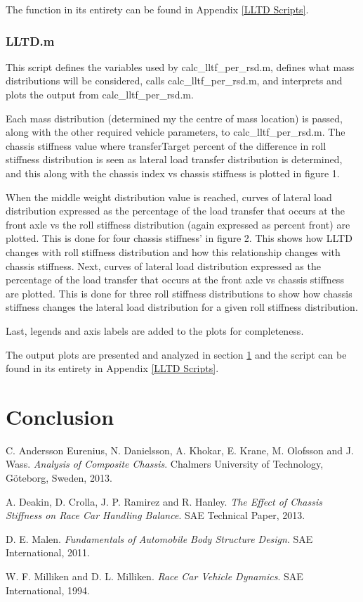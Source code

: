 \documentclass[a4paper]{article}
\numberwithin{equation}{section}
\begin{document}
The function in its entirety can be found in Appendix \ref{LLTD Scripts}.

\subsubsection{LLTD.m} \label{LLTD.m}
This script defines the variables used by calc\_lltf\_per\_rsd.m, defines what mass distributions will be considered, calls calc\_lltf\_per\_rsd.m, and interprets and plots the output from calc\_lltf\_per\_rsd.m.

Each mass distribution (determined my the centre of mass location) is passed, along with the other required vehicle parameters, to calc\_lltf\_per\_rsd.m. The chassis stiffness value where transferTarget percent of the difference in roll stiffness distribution is seen as lateral load transfer distribution is determined, and this along with the chassis index vs chassis stiffness is plotted in figure 1.

When the middle weight distribution value is reached, curves of lateral load distribution expressed as the percentage of the load transfer that occurs at the front axle vs the roll stiffness distribution (again expressed as percent front) are plotted. This is done for four chassis stiffness' in figure 2. This shows how LLTD changes with roll stiffness distribution and how this relationship changes with chassis stiffness. Next, curves of lateral load distribution expressed as the percentage of the load transfer that occurs at the front axle vs chassis stiffness are plotted. This is done for three roll stiffness distributions to show how chassis stiffness changes the lateral load distribution for a given roll stiffness distribution.

Last, legends and axis labels are added to the plots for completeness.

The output plots are presented and analyzed in section \ref{Conclusion} and the script can be found in its entirety in Appendix \ref{LLTD Scripts}.

\section{Conclusion} \label{Conclusion}

\newpage
\begin{thebibliography}{9}
	C. Andersson Eurenius, N. Danielsson, A. Khokar, E. Krane, M. Olofsson and J. Wass.
	\textit{Analysis of Composite Chassis}.
	Chalmers University of Technology, Göteborg, Sweden, 2013.
	
	A. Deakin, D. Crolla, J. P. Ramirez and R. Hanley.
	\textit{The Effect of Chassis Stiffness on Race Car Handling Balance}.
	SAE Technical Paper, 2013.
	
	D. E. Malen.
	\textit{Fundamentals of Automobile Body Structure Design}.
	SAE International, 2011. 
	
	W. F. Milliken and D. L. Milliken.
	\textit{Race Car Vehicle Dynamics}.
	SAE International, 1994. 
	
	\label{References}
\end{thebibliography}
\end{document}
